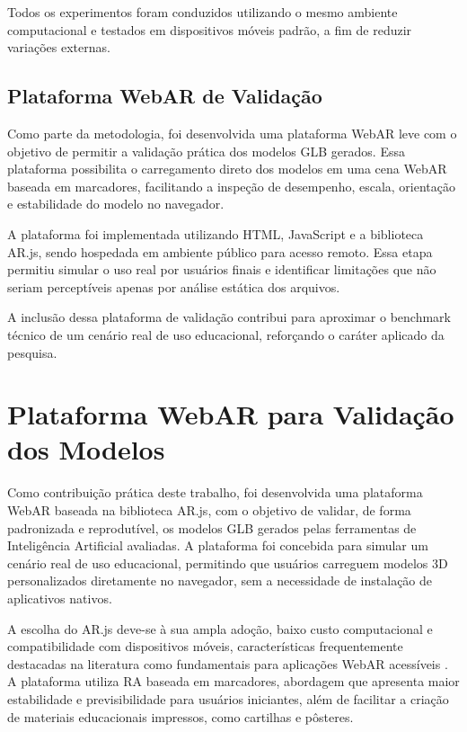 \documentclass[conference]{IEEEtran}
\begin{document}
Todos os experimentos foram conduzidos utilizando o mesmo ambiente computacional e testados em dispositivos móveis padrão, a fim de reduzir variações externas.

\subsection{Plataforma WebAR de Validação}

Como parte da metodologia, foi desenvolvida uma plataforma WebAR leve com o objetivo de permitir a validação prática dos modelos GLB gerados. Essa plataforma possibilita o carregamento direto dos modelos em uma cena WebAR baseada em marcadores, facilitando a inspeção de desempenho, escala, orientação e estabilidade do modelo no navegador.

A plataforma foi implementada utilizando HTML, JavaScript e a biblioteca AR.js, sendo hospedada em ambiente público para acesso remoto. Essa etapa permitiu simular o uso real por usuários finais e identificar limitações que não seriam perceptíveis apenas por análise estática dos arquivos.

A inclusão dessa plataforma de validação contribui para aproximar o benchmark técnico de um cenário real de uso educacional, reforçando o caráter aplicado da pesquisa.

\section{Plataforma WebAR para Validação dos Modelos}

Como contribuição prática deste trabalho, foi desenvolvida uma plataforma WebAR baseada na biblioteca AR.js, com o objetivo de validar, de forma padronizada e reprodutível, os modelos GLB gerados pelas ferramentas de Inteligência Artificial avaliadas. A plataforma foi concebida para simular um cenário real de uso educacional, permitindo que usuários carreguem modelos 3D personalizados diretamente no navegador, sem a necessidade de instalação de aplicativos nativos.

A escolha do AR.js deve-se à sua ampla adoção, baixo custo computacional e compatibilidade com dispositivos móveis, características frequentemente destacadas na literatura como fundamentais para aplicações WebAR acessíveis \cite{koutsabasis2021webar}. A plataforma utiliza RA baseada em marcadores, abordagem que apresenta maior estabilidade e previsibilidade para usuários iniciantes, além de facilitar a criação de materiais educacionais impressos, como cartilhas e pôsteres.
\end{document}
